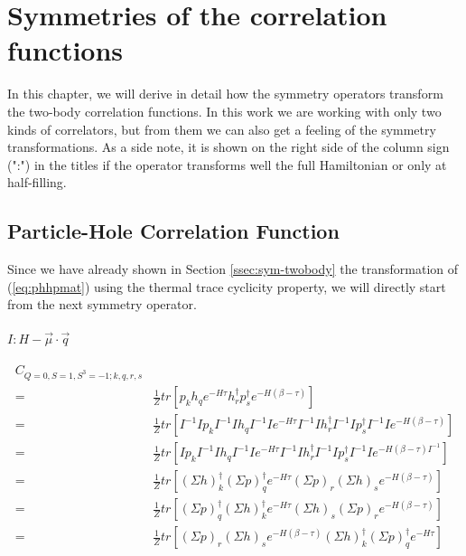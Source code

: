 \chapter{Symmetries of the correlation functions}
\label{sec:app}

 In this chapter, we will derive in detail how the symmetry operators transform the two-body correlation functions. In this work we are working with only two kinds of correlators, but from them we can also get a feeling of the symmetry transformations. As a side note, it is shown on the right side of the column sign (":") in the titles if the operator transforms well the full Hamiltonian or only at half-filling.

\section{Particle-Hole Correlation Function}

Since we have already shown in Section \ref{ssec:sym-twobody} the transformation of (\ref{eq:phhpmat}) using the thermal trace cyclicity property, we will directly start from the next symmetry operator.

\subsubsection{\underline{$I : H - \vec{\mu}\cdot\vec{q}$}}

\begin{equation}
  \begin{aligned}
    C_{Q=0,S=1,S^3=-1;k,q,r,s} \\
    =& \frac{1}{Z}tr\left[p_kh_qe^{-H\tau}h^\dagger_rp^\dagger_se^{-H\left(\beta-\tau\right)}\right] \\
    =& \frac{1}{Z}tr\left[I^{-1}Ip_kI^{-1}Ih_qI^{-1}Ie^{-H\tau}I^{-1}Ih^\dagger_rI^{-1}Ip^\dagger_sI^{-1}Ie^{-H\left(\beta-\tau\right)}\right] \\
    =& \frac{1}{Z}tr\left[Ip_kI^{-1}Ih_qI^{-1}Ie^{-H\tau}I^{-1}Ih^\dagger_rI^{-1}Ip^\dagger_sI^{-1}Ie^{-H\left(\beta-\tau\right)I^{-1}}\right] \\
    =& \frac{1}{Z}tr\left[(\Sigma h)^\dagger_k(\Sigma p)^\dagger_qe^{-H\tau}(\Sigma p)_r(\Sigma h)_se^{-H\left(\beta-\tau\right)}\right] \\
    =& \frac{1}{Z}tr\left[(\Sigma p)^\dagger_q(\Sigma h)^\dagger_ke^{-H\tau}(\Sigma h)_s(\Sigma p)_re^{-H\left(\beta-\tau\right)}\right] \\
    =& \frac{1}{Z}tr\left[(\Sigma p)_r(\Sigma h)_se^{-H\left(\beta-\tau\right)}(\Sigma h)^\dagger_k(\Sigma p)^\dagger_qe^{-H\tau}\right]
  \end{aligned}
\end{equation}

